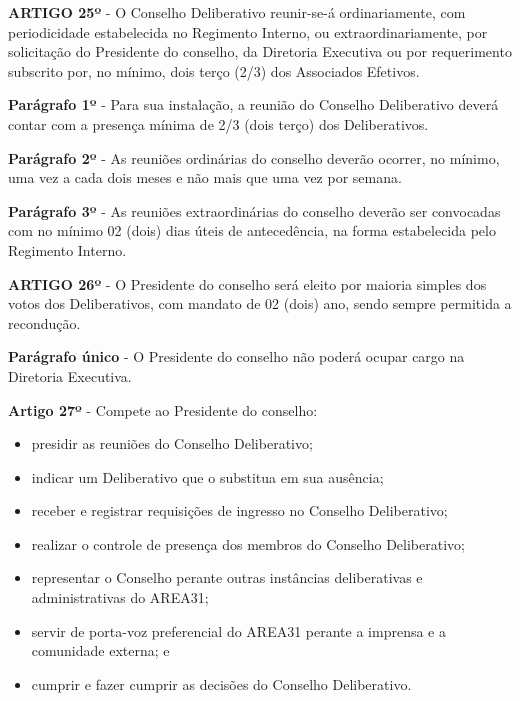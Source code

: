 \textbf{ARTIGO 25º} - O Conselho Deliberativo reunir-se-á ordinariamente, 
com periodicidade estabelecida no Regimento Interno, ou extraordinariamente, 
por solicitação do Presidente do conselho, da Diretoria Executiva ou por 
requerimento subscrito por, no mínimo, dois terço (2/3) 
dos Associados Efetivos.

\bigskip

\textbf{Parágrafo 1º} - Para sua instalação, a reunião do Conselho 
Deliberativo deverá contar com a presença mínima de 2/3 
(dois terço) dos Deliberativos.

\bigskip

\textbf{Parágrafo 2º} - As reuniões ordinárias do conselho deverão ocorrer, 
no mínimo, uma vez a cada dois meses e não mais que uma vez por semana. 

\bigskip

\textbf{Parágrafo 3º} - As reuniões extraordinárias do conselho deverão ser 
convocadas com no mínimo 02 (dois) dias úteis de antecedência, 
na forma estabelecida pelo Regimento Interno.

\bigskip

\textbf{ARTIGO 26º} - O Presidente do conselho será eleito por maioria 
simples dos votos dos Deliberativos, com mandato de 02 (dois) ano, 
sendo sempre permitida a recondução.

\textbf{Parágrafo único} - O Presidente do conselho não poderá ocupar cargo 
na Diretoria Executiva.

\bigskip

\textbf{Artigo 27º} - Compete ao Presidente do conselho:

\begin{itemize}
    \item presidir as reuniões do Conselho Deliberativo;
    \item indicar um Deliberativo que o substitua em sua ausência;
    \item receber e registrar requisições de ingresso no Conselho Deliberativo;
    \item realizar o controle de presença dos membros do Conselho Deliberativo;
    \item representar o Conselho perante outras instâncias deliberativas e administrativas do AREA31;
    \item servir de porta-voz preferencial do AREA31 perante a imprensa e a comunidade externa; e
    \item cumprir e fazer cumprir as decisões do Conselho Deliberativo.
\end{itemize}

